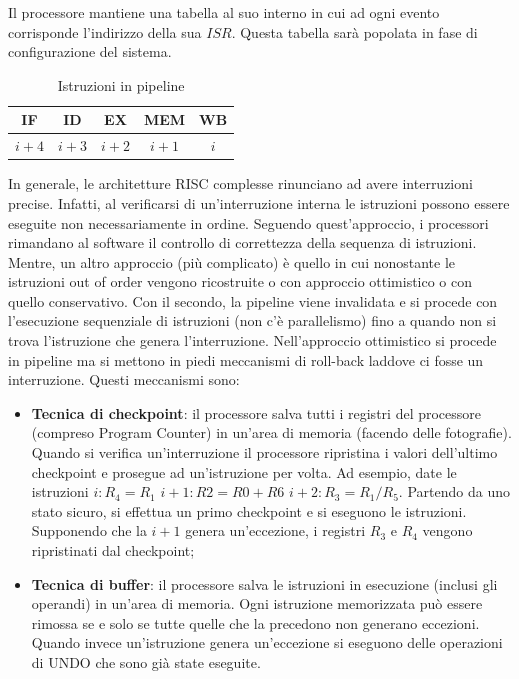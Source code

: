 \documentclass{article}
\begin{document}
Il processore mantiene una tabella al suo interno in cui ad ogni evento 
corrisponde l'indirizzo della sua $ISR$. Questa tabella sarà popolata in 
fase di configurazione del sistema.

\begin{table}
  \center
  \begin{tabular}{|c|c|c|c|c|}
    \hline
    IF & ID & EX & MEM & WB\\
    \hline
    $i+4$ & $i + 3$ & $i+2$ & $i+1$ & $i$\\
    \hline
  \end{tabular}
  \caption{Istruzioni in pipeline}
  \label{tab:int_pipeline}
\end{table}

In generale, le architetture RISC complesse rinunciano ad avere interruzioni 
precise. Infatti, al verificarsi di un'interruzione interna le istruzioni 
possono essere eseguite non necessariamente in ordine. Seguendo quest'approccio, 
i processori rimandano al software il controllo di correttezza della sequenza 
di istruzioni. Mentre, un altro approccio (più complicato) è quello in cui 
nonostante le istruzioni out of order vengono ricostruite o con approccio
ottimistico o con quello conservativo. Con il secondo, la pipeline viene
invalidata e si procede con l'esecuzione sequenziale di istruzioni
(non c'è parallelismo) fino a quando non si trova l'istruzione che genera
l'interruzione. Nell'approccio ottimistico si procede in pipeline ma si mettono
in piedi meccanismi di roll-back laddove ci fosse un interruzione.
Questi meccanismi sono:

\begin{itemize}
  \item \textbf{Tecnica di checkpoint}: il processore salva tutti i registri 
    del processore (compreso Program Counter) in un'area di memoria (facendo 
    delle fotografie). Quando si verifica un'interruzione il processore
    ripristina i valori dell'ultimo checkpoint e prosegue ad un'istruzione 
    per volta. Ad esempio, date le istruzioni $i: R_4 = R_1$ $i+1: R2 = R0+R6$ 
    $i+2: R_3 = R_1/R_5$. Partendo da uno stato sicuro, si effettua un primo 
    checkpoint e si eseguono le istruzioni. Supponendo che la $i+1$ genera 
    un'eccezione, i registri $R_3$ e $R_4$ vengono ripristinati dal checkpoint;
  \item \textbf{Tecnica di buffer}: il processore salva le istruzioni 
    in esecuzione (inclusi gli operandi) in un'area di memoria. Ogni istruzione
    memorizzata può essere rimossa se e solo se tutte quelle che la precedono
    non generano eccezioni. Quando invece un'istruzione genera un'eccezione si 
    eseguono delle operazioni di UNDO che sono già state eseguite.
\end{itemize}
\end{document}
